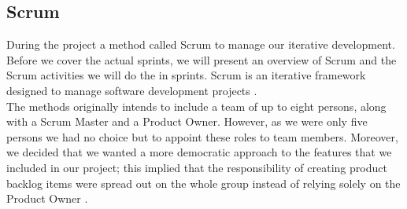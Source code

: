\subsection{Scrum}
During the project a method called Scrum to manage our iterative development. Before we cover the actual sprints, we will present an overview of Scrum and the Scrum activities we will do the in sprints.
\newline
Scrum is an iterative framework designed to manage software development projects \cite{scrumguide}. \\
The methods originally intends to include a team of up to eight persons, along with a Scrum Master and a Product Owner. However, as we were only five persons we had no choice but to appoint these roles to team members. Moreover, we decided that we wanted a more democratic approach to the features that we included in our project; this implied that the responsibility of creating product backlog items were spread out on the whole group instead of relying solely on the Product Owner \cite[p.~12]{scrumguide}.
